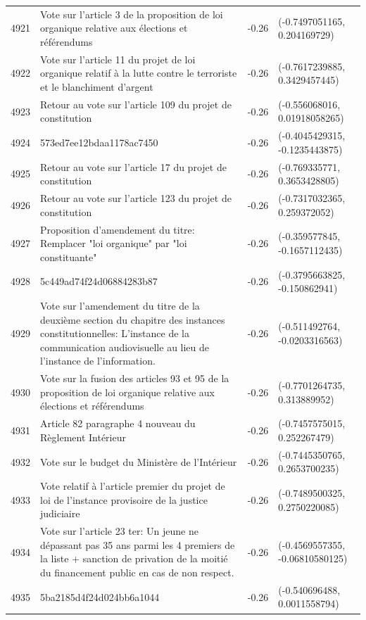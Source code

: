 \begin{table}[ht]
\begin{tabular}{rlrl}
  4921 & Vote sur l'article 3 de la proposition de loi organique relative aux élections et référendums & -0.26 & (-0.7497051165, 0.204169729) \\ 
  4922 & Vote sur l'article 11 du projet de loi organique relatif à la lutte contre le terroriste et le blanchiment d'argent & -0.26 & (-0.7617239885, 0.3429457445) \\ 
  4923 & Retour au vote sur l'article 109 du projet de constitution & -0.26 & (-0.556068016, 0.01918058265) \\ 
  4924 & 573ed7ee12bdaa1178ac7450 & -0.26 & (-0.4045429315, -0.1235443875) \\ 
  4925 & Retour au vote sur l'article 17 du projet de constitution & -0.26 & (-0.769335771, 0.3653428805) \\ 
  4926 & Retour au vote sur l'article 123 du projet de constitution & -0.26 & (-0.7317032365, 0.259372052) \\ 
  4927 & Proposition d'amendement du titre: Remplacer "loi organique" par "loi constituante" & -0.26 & (-0.359577845, -0.1657112435) \\ 
  4928 & 5c449ad74f24d06884283b87 & -0.26 & (-0.3795663825, -0.150862941) \\ 
  4929 & Vote sur l'amendement du titre de la deuxième section du chapitre des instances constitutionnelles: L'instance de la communication audiovisuelle au lieu de l'instance de l'information. & -0.26 & (-0.511492764, -0.0203316563) \\ 
  4930 & Vote sur la fusion des articles 93 et 95 de la proposition de loi organique relative aux élections et référendums & -0.26 & (-0.7701264735, 0.313889952) \\ 
  4931 & Article 82 paragraphe 4 nouveau du Règlement Intérieur & -0.26 & (-0.7457575015, 0.252267479) \\ 
  4932 & Vote sur le budget du Ministère de l'Intérieur & -0.26 & (-0.7445350765, 0.2653700235) \\ 
  4933 & Vote relatif à l'article premier du projet de loi de l'instance provisoire de la justice judiciaire & -0.26 & (-0.7489500325, 0.2750220085) \\ 
  4934 & Vote sur l'article 23 ter: Un jeune ne dépassant pas 35 ans parmi les 4 premiers de la liste + sanction de privation de la moitié du financement public en cas de non respect. & -0.26 & (-0.4569557355, -0.06810580125) \\ 
  4935 & 5ba2185d4f24d024bb6a1044 & -0.26 & (-0.540696488, 0.0011558794) \\ 

\end{tabular}
\end{table}
